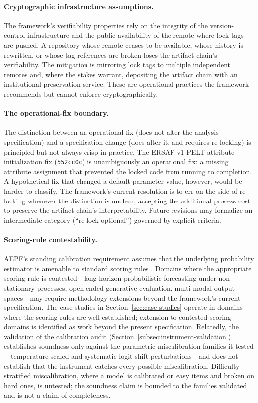\documentclass[11pt]{article}
\begin{document}
\paragraph{Cryptographic infrastructure assumptions.}
The framework's verifiability properties rely on the integrity of
the version-control infrastructure and the public availability of
the remote where lock tags are pushed. A repository whose remote
ceases to be available, whose history is rewritten, or whose tag
references are broken loses the artifact chain's verifiability. The
mitigation is mirroring lock tags to multiple independent remotes
and, where the stakes warrant, depositing the artifact chain with
an institutional preservation service. These are operational
practices the framework recommends but cannot enforce
cryptographically.

\paragraph{The operational-fix boundary.}
The distinction between an operational fix (does not alter the
analysis specification) and a specification change (does alter it,
and requires re-locking) is principled but not always crisp in
practice. The ERSAF v1 PELT attribute-initialization fix
(\texttt{552cc0c}) is unambiguously an operational fix: a missing
attribute assignment that prevented the locked code from running
to completion. A hypothetical fix that changed a default parameter
value, however, would be harder to classify. The framework's
current resolution is to err on the side of re-locking whenever
the distinction is unclear, accepting the additional process cost
to preserve the artifact chain's interpretability. Future revisions
may formalize an intermediate category (``re-lock optional'')
governed by explicit criteria.

\paragraph{Scoring-rule contestability.}
AEPF's standing calibration requirement assumes that the underlying
probability estimator is amenable to standard scoring rules
\cite{brier1950, naeini2015ece, guo2017calibration}. Domains where
the appropriate scoring rule is contested---long-horizon
probabilistic forecasting under non-stationary processes,
open-ended generative evaluation, multi-modal output spaces---may
require methodology extensions beyond the framework's current
specification. The case studies in Section~\ref{sec:case-studies}
operate in domains where the scoring rules are well-established;
extension to contested-scoring domains is identified as work
beyond the present specification. Relatedly, the validation of the
calibration audit (Section~\ref{subsec:instrument-validation})
establishes soundness only against the parametric miscalibration
families it tested---temperature-scaled and systematic-logit-shift
perturbations---and does not establish that the instrument catches
every possible miscalibration. Difficulty-stratified miscalibration,
where a model is calibrated on easy items and broken on hard ones, is
untested; the soundness claim is bounded to the families validated
and is not a claim of completeness.
\end{document}
